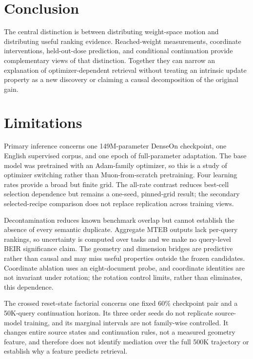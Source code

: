 \documentclass[11pt]{article}
\begin{document}
\FloatBarrier

\section{Conclusion}

\CorrectedConclusionFinding

\DimensionConclusionFinding

\StateOperatorConclusionFinding

The central distinction is between distributing weight-space motion and distributing useful ranking
evidence. Reached-weight measurements, coordinate interventions, held-out-dose prediction, and
conditional continuation provide complementary views of that distinction. Together they can narrow
an explanation of optimizer-dependent retrieval without treating an intrinsic update property as a
new discovery or claiming a causal decomposition of the original gain.

\label{paper-main-end}

\section{Limitations}

Primary inference concerns one 149M-parameter DenseOn checkpoint, one English supervised corpus,
and one epoch of full-parameter adaptation. The base model was pretrained with an Adam-family
optimizer, so this is a study of optimizer switching rather than Muon-from-scratch pretraining.
Four learning rates provide a broad but finite grid. The all-rate contrast reduces best-cell
selection dependence but remains a one-seed, pinned-grid result; the secondary selected-recipe
comparison does not replace replication across training views.

Decontamination reduces known benchmark overlap but cannot establish the absence of every semantic
duplicate. Aggregate MTEB outputs lack per-query rankings, so uncertainty is computed over tasks and
we make no query-level BEIR significance claim. The geometry and dimension bridges are predictive
rather than causal and may miss useful properties outside the frozen candidates. Coordinate
ablation uses an eight-document probe, and coordinate identities are not invariant under rotation;
the rotation control limits, rather than eliminates, this dependence.

The crossed reset-state factorial concerns one fixed 60\% checkpoint pair and a 50K-query
continuation horizon. Its three order seeds do not replicate source-model training, and its marginal
intervals are not family-wise controlled. It changes entire source states and continuation rules,
not a measured geometry feature, and therefore does not identify mediation over the full 500K
trajectory or establish why a feature predicts retrieval.
\end{document}
